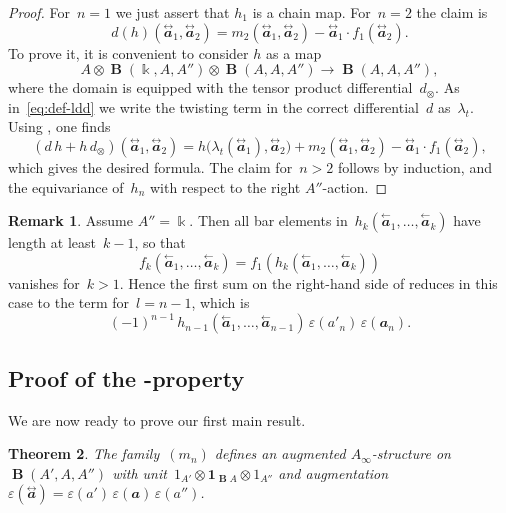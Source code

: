 \documentclass[letterpaper]{amsart}
\numberwithin{equation}{section}
\theoremstyle{plain}
\newtheorem{theorem}{Theorem}[section]
\theoremstyle{definition}
\newtheorem{remark}[theorem]{Remark}
\theoremstyle{remark}
\let\epsilon\varepsilon
\def\Ainf{A_{\infty}}
\DeclareMathOperator{\BB}{\mathbf{B}}
\def\kk{\Bbbk}
\def\BBone{\mathbf{1}}
\def\aa{\mathbfit{a}}
\def\laa{\overset{\text{$\leftarrow$}}{\aa}}
\def\taa{\overset{\text{$\leftrightarrow$}}{\aa}}
\def\ldd{\lambda_{t}}
\def\ff{f_{1}}
\begin{document}
\begin{proof}
  For~$n=1$ we just assert that $h_{1}$ is a chain map. For~$n=2$ the claim is
  \begin{equation}
    d(h)(\taa_{1},\taa_{2}) = m_{2}(\taa_{1},\taa_{2}) - \taa_{1}\cdot \ff(\taa_{2}).
  \end{equation}
  To prove it, it is convenient to consider $h$ as a map
  \begin{equation}
    A \otimes \BB(\kk,A,A'') \otimes \BB(A,A,A'') \to \BB(A,A,A''),
  \end{equation}
  where the domain is equipped with the tensor product differential~$d_{\otimes}$.
  As in~\eqref{eq:def-ldd} we write the twisting term in the correct differential~$d$ as~$\ldd$.
  Using , one finds
  \begin{equation}
    (d\,h+h\,d_{\otimes})(\taa_{1},\taa_{2}) = h\bigl(\ldd(\taa_{1}),\taa_{2}\bigr) + m_{2}(\taa_{1},\taa_{2}) - \taa_{1}\cdot \ff(\taa_{2}),
  \end{equation}
  which gives the desired formula.
  The claim for~$n>2$ follows by induction,  and the equivariance of~$h_{n}$ with respect to the right $A''$-action.
\end{proof}

\begin{remark}
  \label{rem:d-h-k}
  Assume $A''=\kk$. Then all bar elements in~$h_{k}(\laa_{1},\dots,\laa_{k})$ have length at least~$k-1$, so that
  \begin{equation}
    f_{k}(\laa_{1},\dots,\laa_{k}) = \ff(h_{k}(\laa_{1},\dots,\laa_{k}))
  \end{equation}
  vanishes for~$k>1$. Hence the first sum on the right-hand side of 
  reduces in this case to the term for~$l=n-1$, which is
  \begin{equation}
    (-1)^{n-1}\,h_{n-1}(\laa_{1},\dots,\laa_{n-1})\,\epsilon(a'_{n})\,\epsilon(\aa_{n}).
  \end{equation}
\end{remark}


\subsection{Proof of the \texorpdfstring{\boldmath{$\Ainf$}}{A∞}-property}

We are now ready to prove our first main result.

\begin{theorem}
  \label{thm:ainf-bar-twosided}
  The family~$(m_{n})$ defines an augmented $\Ainf$-structure on~$\BB(A',A,A'')$
  with unit~$1_{A'}\otimes\BBone_{\BB A}\otimes 1_{A''}$ and augmentation~$\epsilon(\taa)=\epsilon(a')\,\epsilon(\aa)\,\epsilon(a'')$.
\end{theorem}
\end{document}
